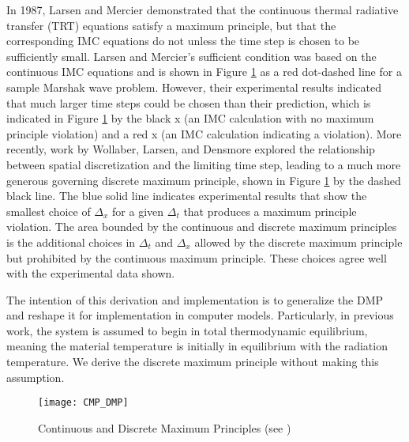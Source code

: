 In 1987, Larsen and Mercier \cite{LarsMerc} demonstrated that the continuous
thermal radiative transfer (TRT) equations satisfy a maximum principle, but
that the corresponding IMC equations do not unless the time step is chosen to
be sufficiently small.  Larsen and Mercier's sufficient condition was based on
the continuous IMC equations and is shown in Figure \ref{CMP_DMP} as a red
dot-dashed line for a sample Marshak wave problem.  However, their experimental
results indicated that much larger time steps could be chosen than their
prediction, which is indicated in Figure \ref{CMP_DMP} by the black x (an IMC
calculation with no maximum principle violation) and a red x (an IMC
calculation indicating a violation).
More recently, work by Wollaber, Larsen, and Densmore explored the relationship
between spatial discretization and the limiting time step, leading to a much
more
generous governing discrete maximum principle, shown in Figure \ref{CMP_DMP}
by the dashed black line. The blue solid line indicates experimental results
that show the smallest choice of $\Delta_x$ for a given $\Delta_t$ that produces
a maximum principle violation.  The area bounded by the continuous and discrete
maximum principles is the additional choices in $\Delta_t$ and $\Delta_x$
allowed by the discrete maximum principle but prohibited by the continuous
maximum principle.  These choices agree well with the experimental data shown.

The intention of this derivation and implementation is to generalize
the DMP and reshape it for implementation in
computer models.  Particularly, in previous work, the system is assumed to begin
in total thermodynamic equilibrium,
meaning the material temperature is initially in equilibrium with the radiation
temperature.  We derive the discrete maximum principle without making this
assumption.

\begin{figure}[htb]
\centering
\texttt{[image: CMP\_DMP]}
\caption{Continuous and Discrete Maximum Principles (see \cite{WolLarDen})}
\label{CMP_DMP}
\end{figure}


